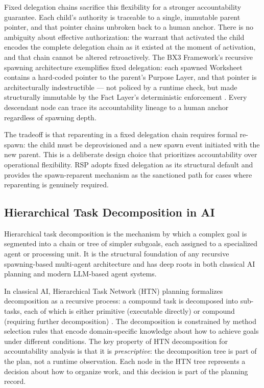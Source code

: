 Fixed delegation chains sacrifice this flexibility for a stronger accountability guarantee. Each child's authority is traceable to a single, immutable parent pointer, and that pointer chains unbroken back to a human anchor. There is no ambiguity about effective authorization: the warrant that activated the child encodes the complete delegation chain as it existed at the moment of activation, and that chain cannot be altered retroactively. The BX3 Framework's recursive spawning architecture exemplifies fixed delegation: each spawned Worksheet contains a hard-coded pointer to the parent's Purpose Layer, and that pointer is architecturally indestructible — not policed by a runtime check, but made structurally immutable by the Fact Layer's deterministic enforcement \cite{bx3framework,bx3framework2026}. Every descendant node can trace its accountability lineage to a human anchor regardless of spawning depth.

The tradeoff is that reparenting in a fixed delegation chain requires formal re-spawn: the child must be deprovisioned and a new spawn event initiated with the new parent. This is a deliberate design choice that prioritizes accountability over operational flexibility. RSP adopts fixed delegation as its structural default and provides the spawn-reparent mechanism as the sanctioned path for cases where reparenting is genuinely required.

\subsection{Hierarchical Task Decomposition in AI}

Hierarchical task decomposition is the mechanism by which a complex goal is segmented into a chain or tree of simpler subgoals, each assigned to a specialized agent or processing unit. It is the structural foundation of any recursive spawning-based multi-agent architecture and has deep roots in both classical AI planning and modern LLM-based agent systems.

In classical AI, Hierarchical Task Network (HTN) planning formalizes decomposition as a recursive process: a compound task is decomposed into sub-tasks, each of which is either primitive (executable directly) or compound (requiring further decomposition) \cite{htn1993,htn2000}. The decomposition is constrained by method selection rules that encode domain-specific knowledge about how to achieve goals under different conditions. The key property of HTN decomposition for accountability analysis is that it is \emph{prescriptive}: the decomposition tree is part of the plan, not a runtime observation. Each node in the HTN tree represents a decision about how to organize work, and this decision is part of the planning record.


